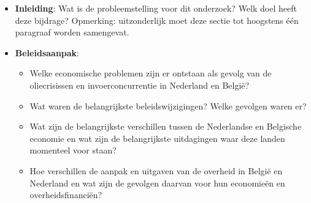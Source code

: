\begin{itemize}
	\item \textbf{Inleiding}: Wat is de probleemstelling voor dit onderzoek? Welk doel heeft deze bijdrage? Opmerking: uitzonderlijk moet deze sectie tot hoogstens één paragraaf worden samengevat.
	\item \textbf{Beleidsaanpak}: 
	\begin{itemize}
		\item Welke economische problemen zijn er ontstaan als gevolg van de oliecrisissen en invoerconcurrentie in Nederland en België?
		\item Wat waren de belangrijkste beleidswijzigingen? Welke gevolgen waren er?
		\item Wat zijn de belangrijkste verschillen tussen de Nederlandse en Belgische economie en wat zijn de belangrijkste uitdagingen waar deze landen momenteel voor staan?
		\item Hoe verschillen de aanpak en uitgaven van de overheid in België en Nederland en wat zijn de gevolgen daarvan voor hun economieën en overheidsfinanciën?
	\end{itemize}
	

\end{itemize}
